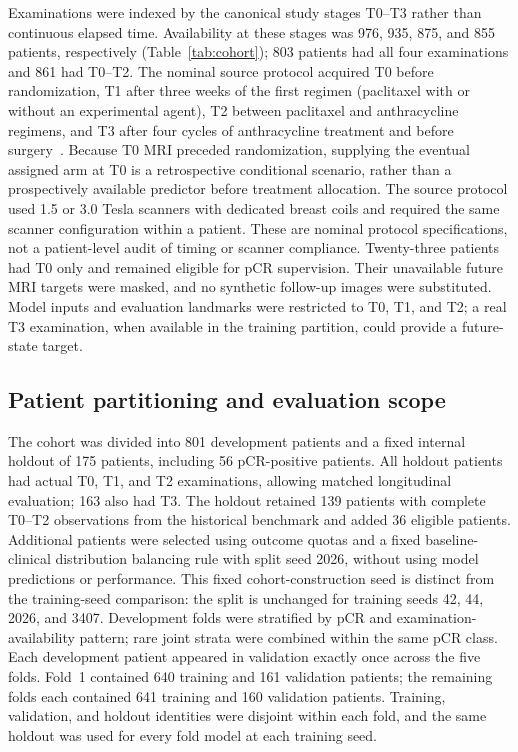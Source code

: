 Examinations were indexed by the canonical study stages T0--T3 rather than
continuous elapsed time. Availability at these stages was 976, 935, 875, and
855 patients, respectively (Table~\ref{tab:cohort}); 803 patients had all four
examinations and 861 had T0--T2. The nominal source protocol acquired T0 before
randomization, T1 after three weeks of the first regimen (paclitaxel with or
without an experimental agent), T2 between paclitaxel and anthracycline
regimens, and T3 after four cycles of anthracycline treatment and before
surgery~\citep{tciaispy2_2022}. Because T0 MRI preceded randomization, supplying
the eventual assigned arm at T0 is a retrospective conditional scenario,
rather than a prospectively available predictor before treatment allocation.
The source protocol used 1.5 or 3.0 Tesla scanners with dedicated breast coils
and required the same scanner configuration within a patient. These are
nominal protocol specifications, not a patient-level audit of timing or
scanner compliance. Twenty-three patients had T0 only and remained
eligible for pCR supervision. Their unavailable future MRI targets were
masked, and no synthetic follow-up images were substituted. Model inputs and
evaluation landmarks were restricted to T0, T1, and T2; a real T3 examination,
when available in the training partition, could provide a future-state target.

\subsection{Patient partitioning and evaluation scope}
The cohort was divided into 801 development patients and a fixed internal
holdout of 175 patients, including 56 pCR-positive patients. All holdout
patients had actual T0, T1, and T2 examinations, allowing matched longitudinal
evaluation; 163 also had T3. The holdout retained 139 patients with complete
T0--T2 observations from the historical benchmark and added 36 eligible
patients. Additional patients were selected using outcome quotas and a fixed
baseline-clinical distribution balancing rule with split seed 2026, without
using model predictions or performance. This fixed cohort-construction seed
is distinct from the training-seed comparison: the split is unchanged for
training seeds 42, 44, 2026, and 3407. Development folds were stratified by
pCR and examination-availability pattern; rare joint strata were combined
within the same pCR class. Each development patient appeared in validation
exactly once across the five folds. Fold~1 contained 640 training and 161
validation patients; the remaining folds each contained 641 training and 160
validation patients. Training, validation, and holdout identities were
disjoint within each fold, and the same holdout was used for every fold
model at each training seed.

